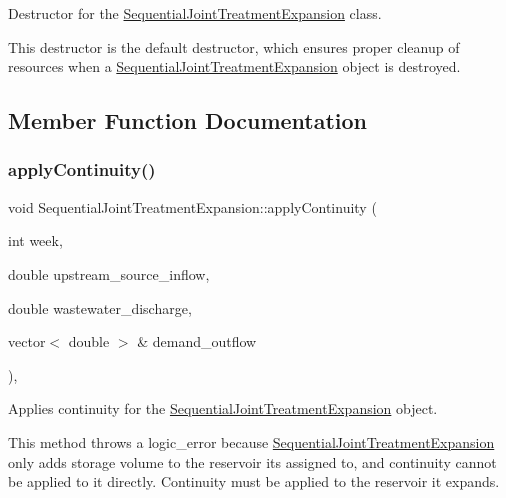 Destructor for the \mbox{\hyperlink{classSequentialJointTreatmentExpansion}{Sequential\+Joint\+Treatment\+Expansion}} class. 

This destructor is the default destructor, which ensures proper cleanup of resources when a {\ttfamily \mbox{\hyperlink{classSequentialJointTreatmentExpansion}{Sequential\+Joint\+Treatment\+Expansion}}} object is destroyed. 

\subsection{Member Function Documentation}
\mbox{\label{classSequentialJointTreatmentExpansion_a64fdd68fc68f6b1145291575c2116815}} 
\subsubsection{\texorpdfstring{apply\+Continuity()}{applyContinuity()}}
{\footnotesize\ttfamily void Sequential\+Joint\+Treatment\+Expansion\+::apply\+Continuity (\begin{DoxyParamCaption}\item[{int}]{week,  }\item[{double}]{upstream\+\_\+source\+\_\+inflow,  }\item[{double}]{wastewater\+\_\+discharge,  }\item[{vector$<$ double $>$ \&}]{demand\+\_\+outflow }\end{DoxyParamCaption})\hspace{0.3cm}{\ttfamily [override]}, {\ttfamily [virtual]}}



Applies continuity for the \mbox{\hyperlink{classSequentialJointTreatmentExpansion}{Sequential\+Joint\+Treatment\+Expansion}} object. 

This method throws a {\ttfamily logic\+\_\+error} because {\ttfamily \mbox{\hyperlink{classSequentialJointTreatmentExpansion}{Sequential\+Joint\+Treatment\+Expansion}}} only adds storage volume to the reservoir it\textquotesingle{}s assigned to, and continuity cannot be applied to it directly. Continuity must be applied to the reservoir it expands.


